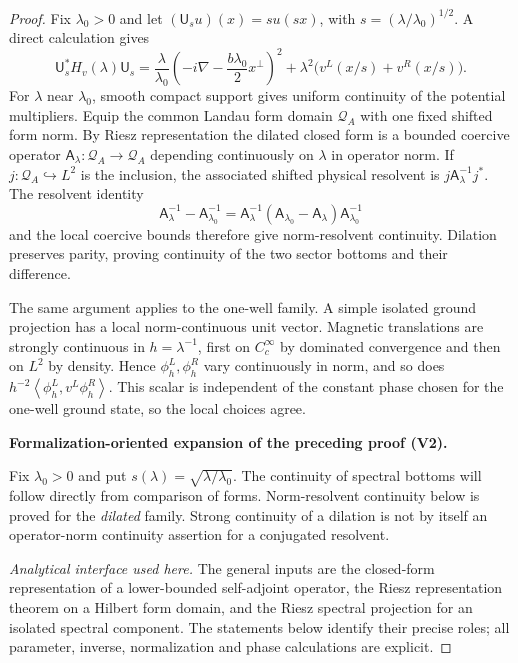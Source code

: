 \documentclass[11pt]{article}
\newcommand{\formalisationparentid}{X}
\newenvironment{formalisationaddition}[1]{\par\medskip\begingroup\color{blue}\def\formalisationparentid{#1}\setcounter{formalizationsublemma}{0}\let\lemma\formalizationsublemma\let\endlemma\endformalizationsublemma
  \def\Eo{\mathcal E_h^\circ}\def\EE{\mathcal E_h}\def\phio{\phi_h^\circ}\def\phih{\phi_h}\def\Ho{H_h^{\rm atom}(v^\circ)}\def\Ha{H_h^{\rm atom}}\def\HL{H_h^{L}}\def\Dh{D_h}\def\Log{\operatorname{Log}}\def\ellh{\ell_h}\def\Gp{G_{p,h}}\def\Ast{A_{*,h}}\def\ahat{\widehat{\mathfrak a}_h}\def\ah{\mathfrak a_h}\def\rh{\widehat\rho_h}\def\deltah{\widehat\delta_h}\def\oldref##1{\textup{(##1)}}\def\interface##1{\par\noindent\textit{Analytical interface used here.} ##1\par}\def\finish{\par\noindent\textit{Conclusion of the formalization-oriented expansion.} }\par\noindent\textbf{Formalization-oriented expansion of the preceding proof (V2).}\par\smallskip
}{\par\endgroup\medskip
}
\newcommand{\ip}[2]{\left\langle #1,#2\right\rangle}
\begin{document}
\begin{proof}
Fix $\lambda_0>0$ and let $(\mathsf U_su)(x)=su(sx)$, with
$s=(\lambda/\lambda_0)^{1/2}$.  A direct calculation gives
\begin{equation}\label{eq:dilation-continuity}
 \mathsf U_s^*H_v(\lambda)\mathsf U_s
 =\frac{\lambda}{\lambda_0}
 \left(-i\nabla-\frac{b\lambda_0}{2}x^\perp\right)^2
 +\lambda^2\bigl(v^L(x/s)+v^R(x/s)\bigr).
\end{equation}
For $\lambda$ near $\lambda_0$, smooth compact support gives uniform
continuity of the potential multipliers.  Equip the common Landau form domain
$\mathcal Q_A$ with one fixed shifted form norm.  By Riesz representation the
dilated closed form is a bounded coercive operator
$\mathsf A_\lambda:\mathcal Q_A\to\mathcal Q_A$ depending continuously on
$\lambda$ in operator norm.  If $j:\mathcal Q_A\hookrightarrow L^2$ is the
inclusion, the associated shifted physical resolvent is
$j\mathsf A_\lambda^{-1}j^*$.  The resolvent identity
\[
 \mathsf A_\lambda^{-1}-\mathsf A_{\lambda_0}^{-1}
 =\mathsf A_\lambda^{-1}(\mathsf A_{\lambda_0}-\mathsf A_\lambda)
  \mathsf A_{\lambda_0}^{-1}
\]
and the local coercive bounds therefore give norm-resolvent continuity.
Dilation preserves parity, proving continuity of the two sector bottoms and
their difference.

The same argument applies to the one-well family.  A simple isolated ground
projection has a local norm-continuous unit vector.  Magnetic translations
are strongly continuous in $h=\lambda^{-1}$, first on $C_c^\infty$ by
dominated convergence and then on $L^2$ by density.  Hence
$\phi_h^L,\phi_h^R$ vary continuously in norm, and so does
$h^{-2}\ip{\phi_h^L}{v^L\phi_h^R}$.  This scalar is independent of the
constant phase chosen for the one-well ground state, so the local choices
agree.

\begin{formalisationaddition}{L8.6}
Fix $\lambda_0>0$ and put $s(\lambda)=\sqrt{\lambda/\lambda_0}$.
The continuity of spectral bottoms will follow directly from comparison
of forms. Norm-resolvent continuity below is proved for the
\emph{dilated} family. Strong continuity of a dilation is not by itself
an operator-norm continuity assertion for a conjugated resolvent.

\interface{The general inputs are the closed-form representation of a
lower-bounded self-adjoint operator, the Riesz representation theorem on
a Hilbert form domain, and the Riesz spectral projection for an isolated
spectral component. The statements below identify their precise roles;
all parameter, inverse, normalization and phase calculations are explicit.}


\end{formalisationaddition}
\end{proof}
\end{document}
